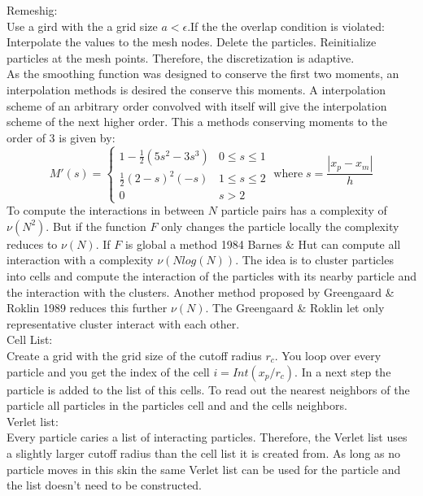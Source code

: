 \documentclass[hyperref]{labbook}
\numberwithin{equation}{experiment}
\numberwithin{table}{experiment}
\numberwithin{figure}{experiment}
\begin{document}
Remeshig: \\
Use a gird with the a grid size $a < \epsilon$.If the the overlap condition is violated:  Interpolate the values to the mesh nodes. Delete the particles. Reinitialize particles at the mesh points. Therefore, the discretization is adaptive.\\ 
As the smoothing function was designed to conserve the first two moments, an interpolation methods is desired the conserve this moments. A interpolation scheme of an arbitrary order convolved with itself will give the interpolation scheme of the next higher order. This a methods conserving moments to the order of 3 is given by: \\ 
\begin{equation}
M'(s ) = \begin{cases}  1 - \frac{1}{2}(5s^2 -  3 s^3)  & 0\leq s \leq 1 \\ \frac{1}{2} (2-s)^2(-s) & 1 \leq s \leq 2 \\ 0 & s > 2  \end{cases} \; \text{where} \; s = \frac{|x_p - x_m|}{h}
\end{equation}
To compute the interactions in between $N$ particle pairs has a complexity of $\nu(N^2)$. But if the function $F$ only changes the particle locally the complexity reduces to $\nu(N)$. If $F$ is global a method 1984 Barnes \& Hut can compute all interaction with a complexity  $\nu(Nlog(N))$. The idea is to cluster particles into cells and compute the interaction of the particles with its nearby particle and the interaction with the clusters. Another method proposed by Greengaard \& Roklin 1989 reduces this further $\nu(N)$. The Greengaard \& Roklin let only representative cluster interact with each other.\\[1em]
Cell List: \\
Create a grid with the grid size of the cutoff radius $r_c$. You loop over every particle and you get the index of the cell $i = Int(x_p/r_c)$. In a next step the particle is added to the list of this cells. To read out the nearest neighbors of the particle all particles in the particles cell and and the cells neighbors.\\[1em]
Verlet list: \\ 
Every particle caries a list of interacting particles. Therefore, the Verlet list  uses a slightly larger cutoff radius than the cell list it is created from. As long as no particle moves in this skin the same Verlet list can be used for the particle and the list doesn't need to be constructed. \\[1em]
\end{document}
